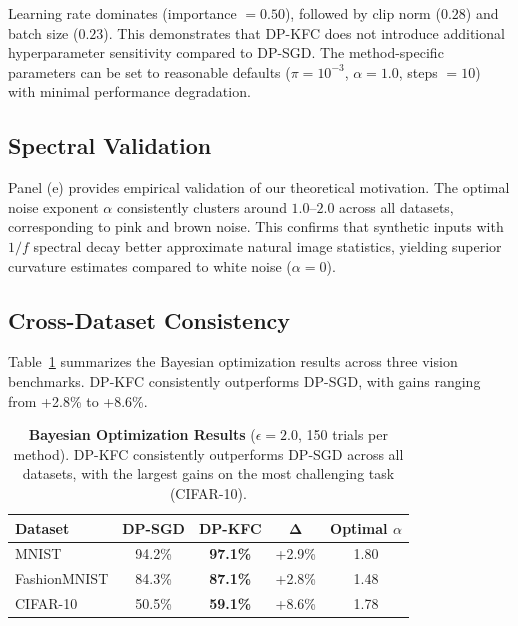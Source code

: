 \documentclass{article}
\theoremstyle{plain}
\theoremstyle{definition}
\theoremstyle{remark}
\begin{document}
  Learning rate dominates (importance $= 0.50$), followed by clip norm ($0.28$) and batch size ($0.23$).  This demonstrates that DP-KFC does not introduce additional hyperparameter sensitivity compared to DP-SGD. The method-specific
   parameters can be set to reasonable defaults ($\pi = 10^{-3}$, $\alpha = 1.0$, steps $= 10$) with minimal performance
  degradation.

  \subsection{Spectral Validation}

  Panel (e) provides empirical validation of our theoretical motivation. The optimal noise exponent $\alpha$ consistently
  clusters around $1.0$--$2.0$ across all datasets, corresponding to pink and brown noise. This confirms that synthetic inputs
  with $1/f$ spectral decay better approximate natural image statistics, yielding superior curvature estimates compared to white
  noise ($\alpha = 0$).

  \subsection{Cross-Dataset Consistency}
  

  Table~\ref{tab:optuna_summary} summarizes the Bayesian optimization results across three vision benchmarks. DP-KFC
  consistently outperforms DP-SGD, with gains ranging from +2.8\% to +8.6\%.

  \begin{table}[h]
  \centering
  \caption{\textbf{Bayesian Optimization Results} ($\epsilon=2.0$, 150 trials per method). DP-KFC consistently outperforms
  DP-SGD across all datasets, with the largest gains on the most challenging task (CIFAR-10).}
  \label{tab:optuna_summary}
  \begin{tabular}{lcccc}
  \toprule
  \textbf{Dataset} & \textbf{DP-SGD} & \textbf{DP-KFC} & $\mathbf{\Delta}$ & \textbf{Optimal $\alpha$} \\
  \midrule
  MNIST & 94.2\% & \textbf{97.1\%} & +2.9\% & 1.80 \\
  FashionMNIST & 84.3\% & \textbf{87.1\%} & +2.8\% & 1.48 \\
  CIFAR-10 & 50.5\% & \textbf{59.1\%} & +8.6\% & 1.78 \\
  \bottomrule
  \end{tabular}
  \end{table}
\end{document}
